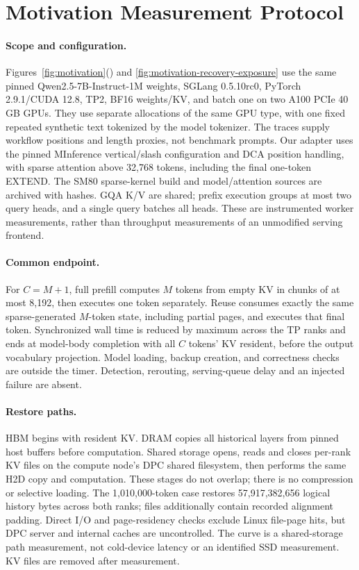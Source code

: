 \appendix
\section{Motivation Measurement Protocol}
\label{sec:motivation-protocol}

\paragraph{Scope and configuration.}
Figures~\ref{fig:motivation}() and
\ref{fig:motivation-recovery-exposure} use the same pinned
Qwen2.5-7B-Instruct-1M weights, SGLang 0.5.10rc0, PyTorch 2.9.1/CUDA 12.8,
TP2, BF16 weights/KV, and batch one on two A100 PCIe 40\,GB GPUs.
They use separate allocations of the same GPU type, with one fixed
repeated synthetic text tokenized by the model tokenizer. The traces
supply workflow positions and length proxies, not benchmark prompts.
Our adapter uses the pinned MInference vertical/slash configuration and
DCA position handling, with sparse attention above 32,768 tokens,
including the final one-token EXTEND. The SM80 sparse-kernel build and
model/attention sources are archived with hashes. GQA K/V are shared;
prefix execution groups at most two query heads, and a single query
batches all heads. These are instrumented worker measurements, rather
than throughput measurements of an unmodified serving frontend.

\paragraph{Common endpoint.}
For $C=M+1$, full prefill computes $M$ tokens from empty KV in chunks of
at most 8,192, then executes one token separately. Reuse consumes exactly
the same sparse-generated $M$-token state, including partial pages, and
executes that final token. Synchronized wall time is reduced by maximum
across the TP ranks and ends at model-body completion with all $C$ tokens'
KV resident, before the output vocabulary projection. Model loading,
backup creation, and correctness checks are outside the timer. Detection,
rerouting, serving-queue delay and an injected failure are absent.

\paragraph{Restore paths.}
HBM begins with resident KV. DRAM copies all historical layers from
pinned host buffers before computation. Shared storage opens, reads and
closes per-rank KV files on the compute node's DPC shared filesystem,
then performs the same H2D copy and computation. These stages do not
overlap; there is no compression or selective loading. The 1,010,000-token
case restores 57,917,382,656 logical history bytes across both ranks;
files additionally contain recorded alignment padding. Direct I/O and
page-residency checks exclude Linux file-page hits, but DPC server and
internal caches are uncontrolled. The curve is a shared-storage path
measurement, not cold-device latency or an identified SSD measurement.
KV files are removed after measurement.

